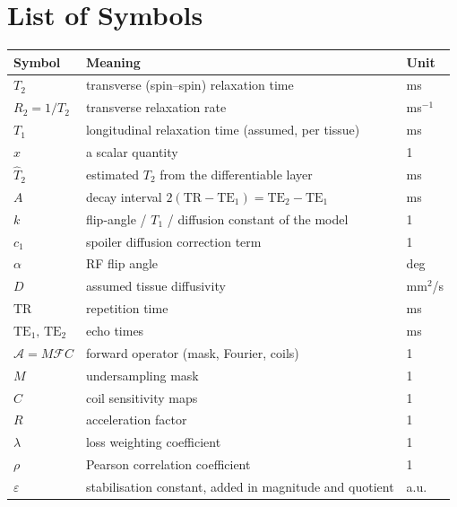 \cleardoublepage
\chapter*{List of Symbols}


\begin{center}
\renewcommand{\arraystretch}{1.3}
\begin{tabular}{@{}l l l@{}}
\toprule
Symbol & Meaning & Unit \\
\midrule
$T_2$            & transverse (spin--spin) relaxation time            & ms \\
$R_2 = 1/T_2$    & transverse relaxation rate                          & ms$^{-1}$ \\
$T_1$            & longitudinal relaxation time (assumed, per tissue)  & ms \\
$x$              & a scalar quantity                                    & 1    \\
$\hat{T}_2$      & estimated $T_2$ from the differentiable layer        & ms \\
$A$              & decay interval $2(\mathrm{TR}-\mathrm{TE}_1)=\mathrm{TE}_2-\mathrm{TE}_1$ & ms \\
$k$              & flip-angle / $T_1$ / diffusion constant of the model & 1 \\
$c_1$            & spoiler diffusion correction term                    & 1 \\
$\alpha$         & RF flip angle                                        & deg \\
$D$              & assumed tissue diffusivity                           & mm$^2$/s \\
$\mathrm{TR}$    & repetition time                                      & ms \\
$\mathrm{TE}_1,\, \mathrm{TE}_2$ & echo times                          & ms \\
$\mathcal{A}=M\mathcal{F}C$ & forward operator (mask, Fourier, coils)   & 1 \\
$M$              & undersampling mask                                   & 1 \\
$C$              & coil sensitivity maps                                & 1 \\
$R$              & acceleration factor                                  & 1 \\
$\lambda$        & loss weighting coefficient                           & 1 \\
$\rho$           & Pearson correlation coefficient                      & 1 \\
$\varepsilon$    & stabilisation constant, added in magnitude and quotient & a.u. \\
\bottomrule
\end{tabular}
\end{center}
